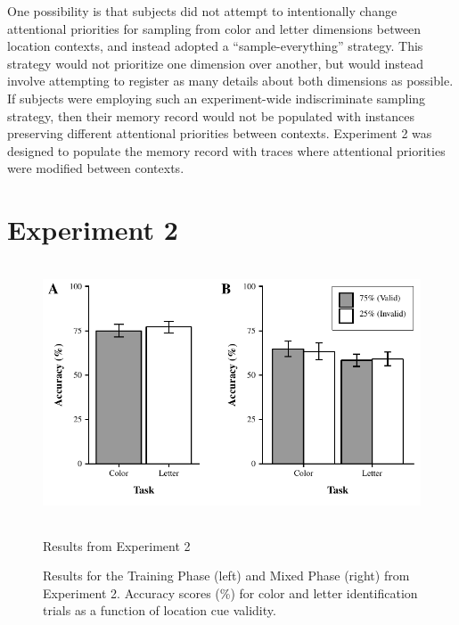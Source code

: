 \documentclass[]{DissertateCUNY}
\begin{document}
One possibility is that subjects did not attempt to intentionally change
attentional priorities for sampling from color and letter dimensions
between location contexts, and instead adopted a ``sample-everything''
strategy. This strategy would not prioritize one dimension over another,
but would instead involve attempting to register as many details about
both dimensions as possible. If subjects were employing such an
experiment-wide indiscriminate sampling strategy, then their memory
record would not be populated with instances preserving different
attentional priorities between contexts. Experiment 2 was designed to
populate the memory record with traces where attentional priorities were
modified between contexts.

\hypertarget{experiment-2}{%
\section{Experiment 2}\label{experiment-2}}

\begin{figure}
  \centering
  \includegraphics[height=3in]{figures/ICfigure3.pdf}
  \caption{Results from Experiment 2}
  \caption*{Results for the Training Phase (left) and Mixed Phase (right) from Experiment 2. Accuracy scores (\%) for color and letter identification trials as a
function of location cue validity.}
  \label{IC_figure3}
\end{figure}
\end{document}
